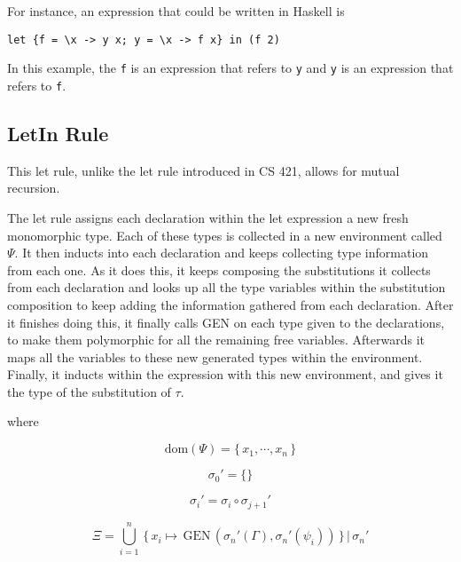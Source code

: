 For instance, an expression that could be written in Haskell is

\begin{lstlisting}
let {f = \x -> y x; y = \x -> f x} in (f 2)
\end{lstlisting}

In this example, the \texttt{f} is an expression that refers to \texttt{y} and \texttt{y} is an expression that refers to \texttt{f}.

\subsection{LetIn Rule}
This let rule, unlike the let rule introduced in CS 421, allows for mutual recursion.

The let rule assigns each declaration within the let expression a new fresh monomorphic type. Each of these types is collected in a new environment called \texttt{$\Psi$}. It then inducts into each declaration and keeps collecting type information from each one. As it does this, it keeps composing the substitutions it collects from each declaration and looks up all the type variables within the substitution composition to keep adding the information gathered from each declaration. After it finishes doing this, it finally calls GEN on each type given to the declarations, to make them polymorphic for all the remaining free variables. Afterwards it maps all the variables to these new generated types within the environment. Finally, it inducts within the expression with this new environment, and gives it the type of the substitution of \texttt{$\tau$}.

\begin{prooftree}
\end{prooftree}

\noindent
where

$$\text{dom} ( \Psi ) = \{ \, x_1, \cdots, x_n \, \}$$

$$\sigma_0' = \{\}$$

$$\sigma_i' = \sigma_i \circ \sigma_{j + 1}'$$

$$\Xi = \bigcup_{i = 1}^n \, \{ \, x_i \mapsto \, \text{GEN} \, ( \sigma_n'(\Gamma),\sigma_n'(\psi_i) ) \, \} \, | \, \sigma_n'$$

\begin{prooftree}
\end{prooftree}

